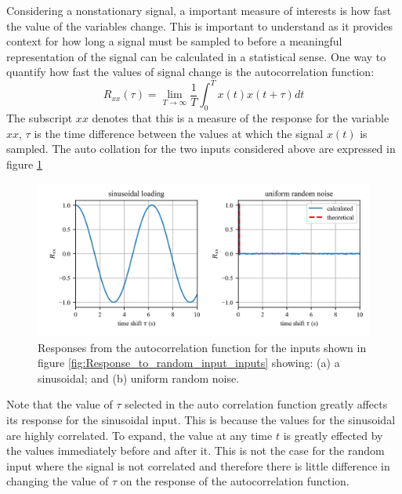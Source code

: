 \documentclass[12pt,letter]{article}
\numberwithin{ex}{section} %
\numberwithin{re}{section} %
\begin{document}
Considering a nonstationary signal, a important measure of interests is how fast the value of the variables change. This is important to understand as it provides context for how long a signal must be sampled to before a meaningful representation of the signal can be calculated in a statistical sense. One way to quantify how fast the values of signal change is the autocorrelation function: 
\begin{equation}
R_{xx}(\tau) = \lim\limits_{T \rightarrow \infty} \frac{1}{T} \int_{0}^{T}x(t)x(t+\tau)dt
\end{equation}
The subscript $xx$ denotes that this is a measure of the response for the variable $xx$, $\tau$ is the time difference between the values at which the signal $x(t)$ is sampled. The auto collation for the two inputs considered above are expressed in figure \ref{fig:Response_to_random_input_autocorrelation}
\begin{figure}[H]
	\centering
	\includegraphics[width=1\textwidth]{../Figures/Response_to_random_input_autocorrelation.png}
	\caption{Responses from the autocorrelation function for the inputs shown in figure \ref{fig:Response_to_random_input_inputs} showing: (a) a sinusoidal; and (b) uniform random noise.}
	\label{fig:Response_to_random_input_autocorrelation}
\end{figure}
\noindent Note that the value of $\tau$ selected in the auto correlation function greatly affects its response for the sinusoidal input. This is because the values for the sinusoidal are highly correlated. To expand, the value at any time $t$ is greatly effected by the values immediately before and after it. This is not the case for the random input where the signal is not correlated and therefore there is little difference in changing the value of $\tau$ on the response of the autocorrelation function.  
\end{document}

